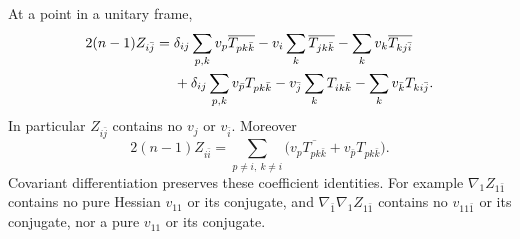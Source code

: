 \begin{lemma}\label{lem:stw-torsion-coefficients}
At a point in a unitary frame,
\begin{align}
 2(n-1)Z_{i\bar j}
 ={}&\delta_{ij}\sum_{p,k}v_p\overline{T_{pk\bar k}}
       -v_i\sum_k\overline{T_{jk\bar k}}
       -\sum_kv_k\overline{T_{kj\bar i}}\notag\\
 &+\delta_{ij}\sum_{p,k}v_{\bar p}T_{pk\bar k}
       -v_{\bar j}\sum_kT_{ik\bar k}
       -\sum_kv_{\bar k}T_{ki\bar j}.
 \label{eq:stw-torsion-six-terms}
\end{align}
In particular $Z_{i\bar j}$ contains no $v_j$ or $v_{\bar i}$. Moreover
\begin{equation}\label{eq:stw-diagonal-torsion}
 2(n-1)Z_{i\bar i}
   =\sum_{p\ne i,\ k\ne i}
        \bigl(v_p\overline{T_{pk\bar k}}+v_{\bar p}T_{pk\bar k}\bigr).
\end{equation}
Covariant differentiation preserves these coefficient identities. For example $\nabla_1 Z_{1\bar1}$ contains no pure Hessian $v_{11}$ or its conjugate, and $\nabla_{\bar1}\nabla_1 Z_{1\bar1}$ contains no $v_{11\bar1}$ or its conjugate, nor a pure $v_{11}$ or its conjugate.
\end{lemma}
